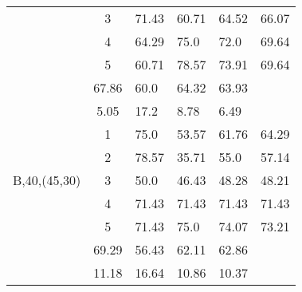 \begin{table}[h]
{\begin{tabular}{cc|llll}
 & 3 & 71.43 & 60.71 & 64.52 & 66.07 \\
 & 4 & 64.29 & 75.0 & 72.0 & 69.64 \\
 & 5 & 60.71 & 78.57 & 73.91 & 69.64 \\
\rowcolor{lightgray!50}\multicolumn{2}{r|}{avg} & 67.86 & 60.0 & 64.32 & 63.93 \\
\rowcolor{lightgray!50}\multicolumn{2}{r|}{std} & 5.05 & 17.2 & 8.78 & 6.49 \\
\multirow{5}{*}{\begin{sideways}B,40,(45,30)\end{sideways}} & 1 & 75.0 & 53.57 & 61.76 & 64.29 \\
 & 2 & 78.57 & 35.71 & 55.0 & 57.14 \\
 & 3 & 50.0 & 46.43 & 48.28 & 48.21 \\
 & 4 & 71.43 & 71.43 & 71.43 & 71.43 \\
 & 5 & 71.43 & 75.0 & 74.07 & 73.21 \\
\rowcolor{lightgray!50}\multicolumn{2}{r|}{avg} & 69.29 & 56.43 & 62.11 & 62.86 \\
\rowcolor{lightgray!50}\multicolumn{2}{r|}{std} & 11.18 & 16.64 & 10.86 & 10.37
\end{tabular}}
\end{table}

